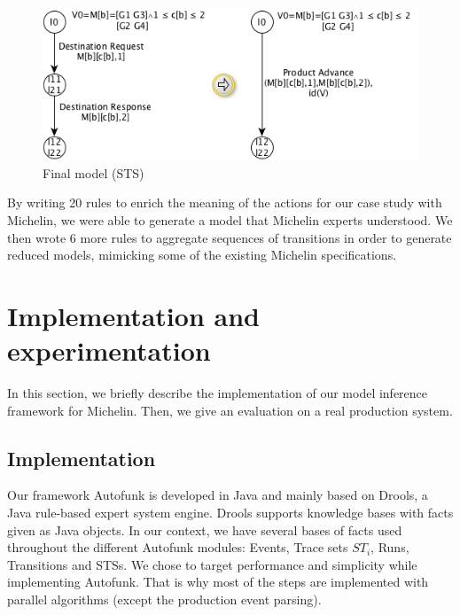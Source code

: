 \begin{figure}[H]
  \includegraphics[width=1.0\linewidth]{figures/STSfinal.png}

	\caption{Final model (STS)}
	\label{fig:finalmodel}
\end{figure}

By writing 20 rules to enrich the meaning of the actions for our
case study with Michelin, we were able to generate a model that
Michelin experts understood. We then wrote 6 more rules to
aggregate sequences of transitions in order to generate reduced
models, mimicking some of the existing Michelin specifications.


\section{Implementation and experimentation}
\label{sec:modelinf:prodsystems:results}

In this section, we briefly describe the implementation of our
model inference framework for Michelin. Then, we give an
evaluation on a real production system.

\subsection{Implementation}
\label{sec:impl-exp-collect}

Our framework Autofunk is developed in Java and mainly based on
Drools, a Java rule-based expert system engine. Drools supports
knowledge bases with facts given as Java objects. In our context,
we have several bases of facts used throughout the different
Autofunk modules: Events, Trace sets $ST_i$, Runs, Transitions
and STSs.  We chose to target performance and simplicity while
implementing Autofunk. That is why most of the steps are
implemented with parallel algorithms (except the production event
parsing).

